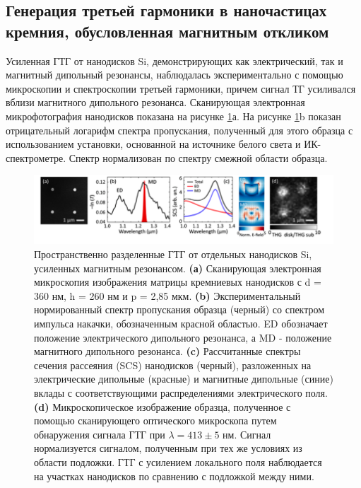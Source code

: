 \subsection*{Генерация третьей гармоники в наночастицах кремния, обусловленная магнитным откликом}
\hspace*{2mm}
Усиленная ГТГ от нанодисков Si, демонстрирующих как электрический, так и магнитный дипольный резонансы, наблюдалась экспериментально \cite{shcherbakov2014enhanced} с помощью микроскопии и спектроскопии третьей гармоники, причем сигнал ТГ усиливался вблизи магнитного дипольного резонанса. Сканирующая электронная микрофотография нанодисков показана на рисунке \ref{nonliner:nanodisks1}а. На рисунке \ref{nonliner:nanodisks1}b показан отрицательный логарифм спектра пропускания, полученный для этого образца с использованием установки, основанной на источнике белого света и ИК-спектрометре. Спектр нормализован по спектру смежной области образца.
\begin{figure}[h!]
	\centering
	\includegraphics[width=1\linewidth]{images/fig4.png}
	\caption{Пространственно разделенные ГТГ от отдельных нанодисков Si, усиленных магнитным резонансом. \textbf{(а)} Сканирующая электронная микроскопия изображения матрицы кремниевых нанодисков с d = 360 нм, h = 260 нм и p = 2,85 мкм. \textbf{(b)} Экспериментальный нормированный спектр пропускания образца (черный) со спектром импульса накачки, обозначенным красной областью. ED обозначает положение электрического дипольного резонанса, а MD - положение магнитного дипольного резонанса. \textbf{(c) }Рассчитанные спектры сечения рассеяния (SCS) нанодисков (черный), разложенных на электрические дипольные (красные) и магнитные дипольные (синие) вклады с соответствующими распределениями электрического поля. \textbf{(d)} Микроскопическое изображение образца, полученное с помощью сканирующего оптического микроскопа путем обнаружения сигнала ГТГ при $\lambda = 413 \pm 5$ нм. Сигнал нормализуется сигналом, полученным при тех же условиях из области подложки. ГТГ с усилением локального поля наблюдается на участках нанодисков по сравнению с подложкой между ними.}
	\label{nonliner:nanodisks1}
\end{figure}
\hspace*{2mm}
